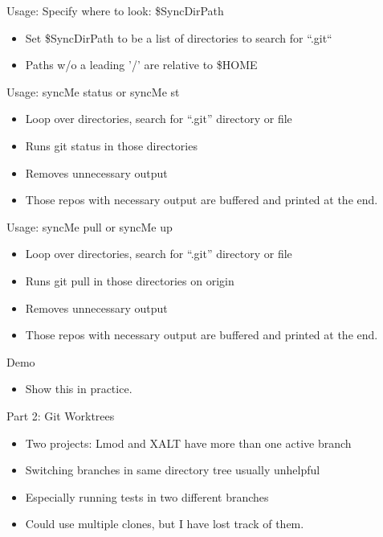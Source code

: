 \documentclass{beamer}
\begin{document}
\begin{frame}{Usage: Specify where to look: \$SyncDirPath}
  \begin{itemize}
    \item Set \$SyncDirPath to be a list of directories to search for
      ``.git``
    \item Paths w/o a leading '/' are relative to \$HOME
  \end{itemize}
\end{frame}

\begin{frame}{Usage: syncMe status or syncMe st}
  \begin{itemize}
    \item Loop over directories, search for ``.git'' directory or file
    \item Runs git status in those directories
    \item Removes unnecessary output
    \item Those repos with necessary output are buffered and printed
      at the end.
  \end{itemize}
\end{frame}

\begin{frame}{Usage: syncMe pull or syncMe up}
  \begin{itemize}
    \item Loop over directories, search for ``.git'' directory or file
    \item Runs git pull in those directories on origin
    \item Removes unnecessary output
    \item Those repos with necessary output are buffered and printed
      at the end.
  \end{itemize}
\end{frame}


\begin{frame}{Demo}
  \begin{itemize}
    \item Show this in practice.
  \end{itemize}
\end{frame}

\begin{frame}{Part 2: Git Worktrees}
  \begin{itemize}
    \item Two projects: Lmod and XALT have more than one active branch
    \item Switching branches in same directory tree usually unhelpful
    \item Especially running tests in two different branches
    \item Could use multiple clones, but I have lost track of them.
  \end{itemize}
\end{frame}
\end{document}
